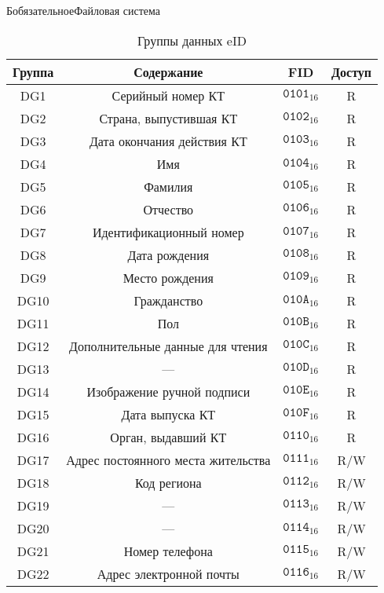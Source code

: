 \begin{appendix}{Б}{обязательное}{Файловая система}
\begin{table}[H]
\caption{Группы данных eID}
\label{Table.FILES.DG}
\begin{tabular}{|c|c|c|c|}
\hline
Группа & Содержание & FID & Доступ\\
\hline
\hline
DG1 & Серийный номер КТ & 
$\texttt{0101}_{16}$ & R\\
DG2 & Страна, выпустившая КТ & 
$\texttt{0102}_{16}$ & R\\
DG3 & Дата окончания действия КТ & 
$\texttt{0103}_{16}$ & R\\
DG4 & Имя & 
$\texttt{0104}_{16}$ & R\\
DG5 & Фамилия & 
$\texttt{0105}_{16}$ & R\\
DG6 & Отчество & 
$\texttt{0106}_{16}$ & R\\
DG7 & Идентификационный номер & 
$\texttt{0107}_{16}$ & R\\
DG8 & Дата рождения & 
$\texttt{0108}_{16}$ & R\\
DG9 & Место рождения & 
$\texttt{0109}_{16}$ & R\\
DG10 & Гражданство & 
$\texttt{010A}_{16}$ & R\\
DG11 & Пол & 
$\texttt{010B}_{16}$ & R\\
DG12 & Дополнительные данные для чтения & 
$\texttt{010C}_{16}$ & R\\
DG13 & 
--- &
$\texttt{010D}_{16}$ & R\\
DG14 & Изображение ручной подписи & 
$\texttt{010E}_{16}$ & R\\
DG15 & Дата выпуска КТ & 
$\texttt{010F}_{16}$ & R\\
DG16 & Орган, выдавший КТ &  
$\texttt{0110}_{16}$ & R\\
DG17 & 	Адрес постоянного места жительства & 
$\texttt{0111}_{16}$ & R/W\\
DG18 & 	Код региона & 
$\texttt{0112}_{16}$ & R/W\\
DG19 & 	
--- &
$\texttt{0113}_{16}$ & R/W\\
DG20 & 	
--- &
$\texttt{0114}_{16}$ & R/W\\
DG21 & 	Номер телефона & 
$\texttt{0115}_{16}$ & R/W\\
DG22 & 	Адрес электронной почты & 
$\texttt{0116}_{16}$ & R/W\\
\hline
\end{tabular}
\end{table}



\end{appendix}
